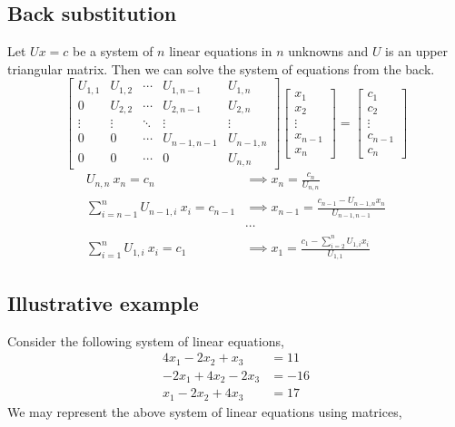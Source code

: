 \subsection{Back substitution}
	Let $Ux = c$ be a system of $n$ linear equations in $n$ unknowns and $U$ is an upper triangular matrix. Then we can solve the system of equations from the back.
	\[ \begin{bmatrix} U_{1,1} & U_{1,2} & \cdots & U_{1,n-1} & U_{1,n} \\ 0 & U_{2,2} & \cdots & U_{2,n-1} & U_{2,n} \\ \vdots & \vdots & \ddots & \vdots & \vdots \\ 0 & 0 & \cdots & U_{n-1,n-1} & U_{n-1,n} \\ 0 & 0 & \cdots & 0 & U_{n,n} \end{bmatrix} \begin{bmatrix} x_1 \\ x_2 \\ \vdots \\ x_{n-1} \\ x_n \end{bmatrix} = \begin{bmatrix} c_1 \\ c_2 \\ \vdots \\ c_{n-1} \\ c_n \end{bmatrix} \]
	\begin{align*}
		U_{n,n}\ x_n = c_n & \implies x_n = \frac{c_n}{U_{n,n}} \\
		\sum_{i=n-1}^{n} U_{n-1,i}\ x_i = c_{n-1}  & \implies x_{n-1} = \frac{c_{n-1} - U_{n-1,n} x_n}{U_{n-1,n-1}} \\
		& \cdots \\
		\sum_{i=1}^n U_{1,i}\ x_i  = c_1 & \implies x_1 = \frac{c_1 - \sum_{i = 2}^{n} U_{1,i} x_i}{U_{1,1}}
	\end{align*}

\subsection{Illustrative example}
	Consider the following system of linear equations,
	\begin{align*}
		4x_1  - 2x_2  + x_3 & = 11 \\
		-2x_1  + 4x_2 - 2x_3 & = -16 \\
		x_1  - 2x_2 + 4x_3 & = 17 
	\end{align*} 
	We may represent the above system of linear equations using matrices,

